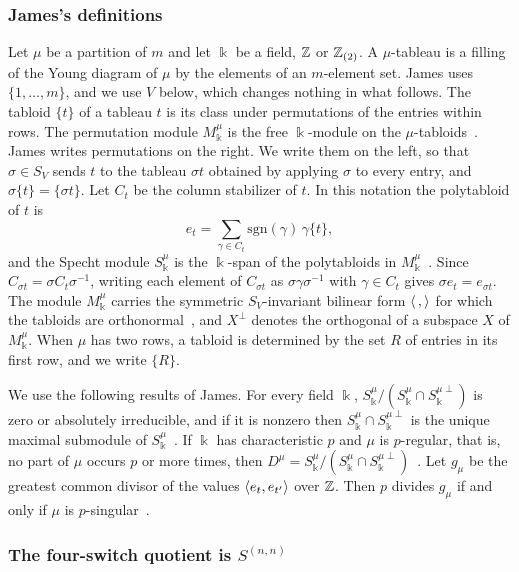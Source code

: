 \subsubsection{James's definitions}\label{subsubsec:james}

Let $\mu$ be a partition of $m$ and let $\Bbbk$ be a field, $\mathbb{Z}$ or $\mathbb{Z}_{(2)}$. A $\mu$-tableau is a filling of the Young diagram of $\mu$ by the elements of an $m$-element set. James uses $\{1,\dots,m\}$, and we use $V$ below, which changes nothing in what follows. The tabloid $\{t\}$ of a tableau $t$ is its class under permutations of the entries within rows. The permutation module $M^\mu_\Bbbk$ is the free $\Bbbk$-module on the $\mu$-tabloids~\cite[4.1]{James78}. James writes permutations on the right. We write them on the left, so that $\sigma\in S_V$ sends $t$ to the tableau $\sigma t$ obtained by applying $\sigma$ to every entry, and $\sigma\{t\}=\{\sigma t\}$. Let $C_t$ be the column stabilizer of $t$. In this notation the polytabloid of $t$ is
\[
e_t=\sum_{\gamma\in C_t}\mathrm{sgn}(\gamma)\,\gamma\{t\},
\]
and the Specht module $S^\mu_\Bbbk$ is the $\Bbbk$-span of the polytabloids in $M^\mu_\Bbbk$~\cite[4.3]{James78}. Since $C_{\sigma t}=\sigma C_t\sigma^{-1}$, writing each element of $C_{\sigma t}$ as $\sigma\gamma\sigma^{-1}$ with $\gamma\in C_t$ gives $\sigma e_t=e_{\sigma t}$. The module $M^\mu_\Bbbk$ carries the symmetric $S_V$-invariant bilinear form $\langle\,,\rangle$ for which the tabloids are orthonormal~\cite[\S4]{James78}, and $X^\perp$ denotes the orthogonal of a subspace $X$ of $M^\mu_\Bbbk$. When $\mu$ has two rows, a tabloid is determined by the set $R$ of entries in its first row, and we write $\{R\}$.

We use the following results of James. For every field $\Bbbk$, $S^\mu_\Bbbk/(S^\mu_\Bbbk\cap S^{\mu\perp}_\Bbbk)$ is zero or absolutely irreducible, and if it is nonzero then $S^\mu_\Bbbk\cap S^{\mu\perp}_\Bbbk$ is the unique maximal submodule of $S^\mu_\Bbbk$~\cite[Thm.~4.9]{James78}. If $\Bbbk$ has characteristic $p$ and $\mu$ is $p$-regular, that is, no part of $\mu$ occurs $p$ or more times, then $D^\mu=S^\mu_\Bbbk/(S^\mu_\Bbbk\cap S^{\mu\perp}_\Bbbk)$~\cite[Def.~11.2]{James78}. Let $g_\mu$ be the greatest common divisor of the values $\langle e_t,e_{t'}\rangle$ over $\mathbb{Z}$. Then $p$ divides $g_\mu$ if and only if $\mu$ is $p$-singular~\cite[10.3--10.5]{James78}.

\subsubsection{The four-switch quotient is \texorpdfstring{$S^{(n,n)}$}{S\textasciicircum(n,n)}}\label{subsubsec:fourswitch}

